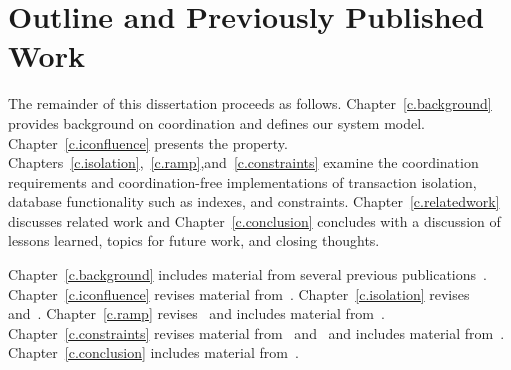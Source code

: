 \section{Outline and Previously Published Work}

The remainder of this dissertation proceeds as
follows. Chapter~\ref{c.background} provides background on
coordination and defines our system model. Chapter~\ref{c.iconfluence}
presents the \IConfluence
property. Chapters~\ref{c.isolation},~\ref{c.ramp},and~\ref{c.constraints}
examine the coordination requirements and coordination-free
implementations of transaction isolation, database functionality such
as indexes, and constraints. Chapter~\ref{c.relatedwork} discusses
related work and Chapter~\ref{c.conclusion} concludes with a
discussion of lessons learned, topics for future work, and closing
thoughts.

Chapter~\ref{c.background} includes material from several previous
publications~\cite{hat-vldb,coord-avoid,partitions-queue14,queue,pbs,pbs-vldbj2013,pbs-demo-sigmod2013}. Chapter~\ref{c.iconfluence}
revises material from~\cite{coord-avoid}. Chapter~\ref{c.isolation}
revises~\cite{hat-vldb} and~\cite{hat-hotos}. Chapter~\ref{c.ramp}
revises~\cite{ramp-sigmod14} and includes material
from~\cite{explicit-socc}. Chapter~\ref{c.constraints} revises
material from~\cite{coord-avoid} and~\cite{apps} and includes material
from~\cite{bolton}. Chapter~\ref{c.conclusion} includes material
from~\cite{velox-overview,admm}.

